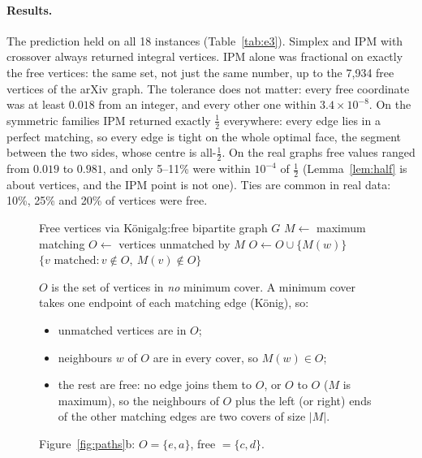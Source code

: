 \paragraph{Results.} The prediction held on all 18 instances (Table~\ref{tab:e3}). Simplex and IPM with crossover always returned integral vertices. IPM alone was fractional on exactly the free vertices: the same set, not just the same number, up to the 7,934 free vertices of the arXiv graph. The tolerance does not matter: every free coordinate was at least $0.018$ from an integer, and every other one within $3.4\times10^{-8}$. On the symmetric families IPM returned exactly $\tfrac12$ everywhere: every edge lies in a perfect matching, so every edge is tight on the whole optimal face, the segment between the two sides, whose centre is all-$\tfrac12$. On the real graphs free values ranged from $0.019$ to $0.981$, and only 5--11\% were within $10^{-4}$ of $\tfrac12$ (Lemma~\ref{lem:half} is about vertices, and the IPM point is not one). Ties are common in real data: 10\%, 25\% and 20\% of vertices were free.

\begin{figure}[H]
  \begin{minipage}[c]{0.475\textwidth}
    \begin{algobox}{Free vertices via König}{alg:free}
      \Require bipartite graph $G$
      \State $M\gets$ maximum matching \cite{hopcroft1973}
      \State $O\gets$ vertices unmatched by $M$
        \State $O\gets O\cup\{M(w)\}$
      \EndWhile
      \State \Return $\{v \text{ matched}: v\notin O,\ M(v)\notin O\}$
    \end{algobox}
  \end{minipage}\hfill
  \begin{minipage}[c]{0.495\textwidth}\small\raggedright
    $O$ is the set of vertices in \emph{no} minimum cover. A minimum cover takes one endpoint of each matching edge (König), so:
    \begin{itemize}[leftmargin=1.2em, itemsep=0pt, parsep=0pt, topsep=1pt]
      \item unmatched vertices are in $O$;
      \item neighbours $w$ of $O$ are in every cover, so $M(w)\in O$;
      \item the rest are free: no edge joins them to $O$, or $O$ to $O$ ($M$ is maximum), so the neighbours of $O$ plus the left (or right) ends of the other matching edges are two covers of size $|M|$.
    \end{itemize}
    Figure~\ref{fig:paths}b: $O=\{e,a\}$, free $=\{c,d\}$.
  \end{minipage}
\end{figure}

